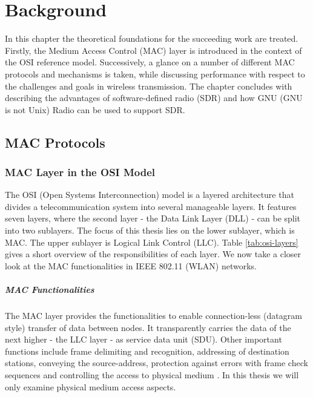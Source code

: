 \chapter{Background}
\label{ch:background}

In this chapter the theoretical foundations for the succeeding work are treated. Firstly, the Medium Access Control (MAC) layer is introduced in the context of the OSI reference model. Successively, a glance on a number of different MAC protocols and mechanisms is taken, while discussing performance with respect to the challenges and goals in wireless transmission. The chapter concludes with describing the advantages of software-defined radio (SDR) and how GNU (GNU is not Unix) Radio can be used to support SDR.

\section{MAC Protocols}

\subsection{MAC Layer in the OSI Model}

The OSI (Open Systems Interconnection) model is a layered architecture that divides a telecommunication system into several manageable layers. It features seven layers, where the second layer - the Data Link Layer (DLL) - can be split into two sublayers. The focus of this thesis lies on the lower sublayer, which is MAC. The upper sublayer is Logical Link Control (LLC). Table \ref{tab:osi-layers} gives a short overview of the responsibilities of each layer. We now take a closer look at the MAC functionalities in IEEE 802.11 (WLAN) networks. 

\paragraph{MAC Functionalities} The MAC layer provides the functionalities to enable connection-less (datagram style) transfer of data between nodes. It transparently carries the data of the next higher - the LLC layer - as service data unit (SDU). Other important functions include frame delimiting and recognition, addressing of destination stations, conveying the source-address, protection against errors with frame check sequences and controlling the access to physical medium \cite{802-std}. In this thesis we will only examine physical medium access aspects. 

